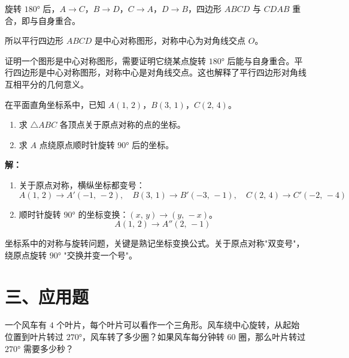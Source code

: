 \documentclass[12pt, a4paper]{ctexart}
\begin{document}
旋转 $180°$ 后，$A \to C$，$B \to D$，$C \to A$，$D \to B$，四边形 $ABCD$ 与 $CDAB$ 重合，即与自身重合。

所以平行四边形 $ABCD$ 是中心对称图形，对称中心为对角线交点 $O$。

\begin{tipbox}[方法总结]
证明一个图形是中心对称图形，需要证明它绕某点旋转 $180°$ 后能与自身重合。平行四边形是中心对称图形，对称中心是对角线交点。这也解释了平行四边形对角线互相平分的几何意义。
\end{tipbox}

\vspace{6pt}

\begin{examplebox}
在平面直角坐标系中，已知 $A(1,\, 2)$，$B(3,\, 1)$，$C(2,\, 4)$。
\begin{enumerate}[label=(\arabic*)]
  \item 求 $\triangle ABC$ 各顶点关于原点对称的点的坐标。
  \item 求 $A$ 点绕原点顺时针旋转 $90°$ 后的坐标。
\end{enumerate}
\end{examplebox}

\textbf{解：}
\begin{enumerate}[label=(\arabic*)]
  \item 关于原点对称，横纵坐标都变号：
  \[
  A(1,\, 2) \to A'(-1,\, -2), \quad B(3,\, 1) \to B'(-3,\, -1), \quad C(2,\, 4) \to C'(-2,\, -4)
  \]
  \item 顺时针旋转 $90°$ 的坐标变换：$(x,\, y) \to (y,\, -x)$。
  \[
  A(1,\, 2) \to A''(2,\, -1)
  \]
\end{enumerate}

\begin{tipbox}[方法总结]
坐标系中的对称与旋转问题，关键是熟记坐标变换公式。关于原点对称"双变号"，绕原点旋转 $90°$ "交换并变一个号"。
\end{tipbox}

\section*{\textcolor{apppurple}{三、应用题}}

\begin{appbox}[【应用1】风车叶片的旋转]
一个风车有 $4$ 个叶片，每个叶片可以看作一个三角形。风车绕中心旋转，从起始位置到叶片转过 $270°$，风车转了多少圈？如果风车每分钟转 $60$ 圈，那么叶片转过 $270°$ 需要多少秒？
\end{appbox}
\end{document}
